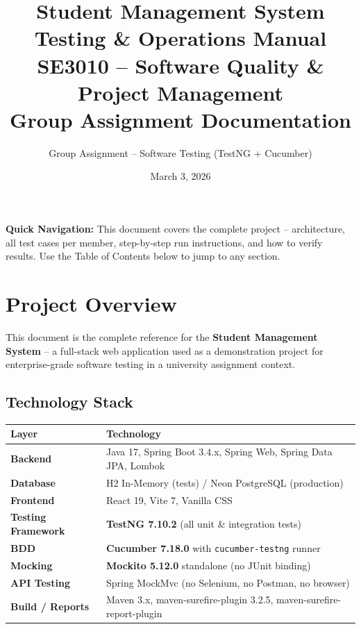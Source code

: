 \documentclass[12pt,a4paper]{article}
\title{
  \vspace{-1cm}
  \textcolor{headerblue}{\Huge\textbf{Student Management System}}\\[0.4cm]
  \Large Testing \& Operations Manual\\[0.3cm]
  \normalsize SE3010 -- Software Quality \& Project Management\\[0.2cm]
  \normalsize Group Assignment Documentation
}
\author{Group Assignment -- Software Testing (TestNG + Cucumber)}
\date{March 3, 2026}
\begin{document}
\maketitle
\thispagestyle{empty}

\begin{infoblock}
\textbf{Quick Navigation:} This document covers the complete project -- architecture,
all test cases per member, step-by-step run instructions, and how to verify results.
Use the Table of Contents below to jump to any section.
\end{infoblock}

\vspace{0.5cm}
\tableofcontents
\newpage

\section{Project Overview}

This document is the complete reference for the \textbf{Student Management System} --
a full-stack web application used as a demonstration project for enterprise-grade software
testing in a university assignment context.

\subsection{Technology Stack}

\begin{tabularx}{\textwidth}{>{\bfseries}lX}
\toprule
Layer & Technology \\
\midrule
Backend & Java 17, Spring Boot 3.4.x, Spring Web, Spring Data JPA, Lombok \\
Database & H2 In-Memory (tests) / Neon PostgreSQL (production) \\
Frontend & React 19, Vite 7, Vanilla CSS \\
Testing Framework & \textbf{TestNG 7.10.2} (all unit \& integration tests) \\
BDD & \textbf{Cucumber 7.18.0} with \texttt{cucumber-testng} runner \\
Mocking & \textbf{Mockito 5.12.0} standalone (no JUnit binding) \\
API Testing & Spring MockMvc (no Selenium, no Postman, no browser) \\
Build / Reports & Maven 3.x, maven-surefire-plugin 3.2.5, maven-surefire-report-plugin \\
\bottomrule
\end{tabularx}
\end{document}
